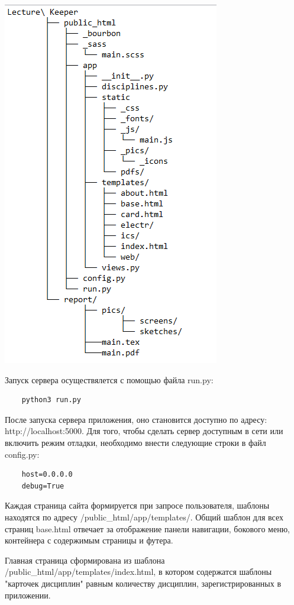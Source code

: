 \includegraphics{codes/file_struct.png}

Запуск сервера осуществялется с помощью файла run.py:

\begin{lstlisting}
	python3 run.py
\end{lstlisting}

После запуска сервера приложения, оно становится доступно по адресу: http://localhost:5000. Для того, чтобы сделать сервер доступным в сети или включить режим отладки, необходимо внести следующие строки в файл config.py:

\begin{lstlisting}
	host=0.0.0.0
	debug=True
\end{lstlisting}

Каждая страница сайта формируется при запросе пользователя, шаблоны находятся по адресу /public\_html/app/templates/. Общий шаблон для всех страниц base.html отвечает за отображение панели навигации, бокового меню, контейнера с содержимым страницы и футера.

Главная страница сформирована из шаблона /public\_html/app/templates/index.html, в котором содержатся шаблоны "карточек дисциплин" равным количеству дисциплин, зарегистрированных в приложении.

